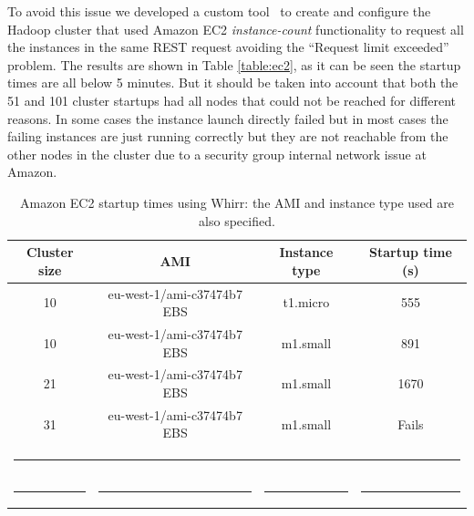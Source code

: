 To avoid this issue we developed a custom tool~\cite{hadoopondemand} to create and configure the Hadoop cluster that used Amazon EC2 \emph{instance-count} functionality to request all the instances in the same REST request avoiding the ``Request limit exceeded'' problem. The results are shown in Table \ref{table:ec2}, as it can be seen the startup times are all below 5 minutes. But it should be taken into account that both the 51 and 101 cluster startups had all nodes that could not be reached for different reasons. In some cases the instance launch directly failed but in most cases the failing instances are just running correctly but they are not reachable from the other nodes in the cluster due to a security group internal network issue at Amazon.


\begin{table}[h!]
\caption{Amazon EC2 startup times using Whirr: the AMI and instance type used are also specified.}
\label{table:whirr}
%
\vspace{-0.5em}
%
\begin{center}
\begin{tabular}{cccc}
\toprule
Cluster size				& AMI				& Instance type		& Startup time (s) 	  \\
\midrule
10                   			& eu-west-1/ami-c37474b7 EBS	& t1.micro 		& 555   		  \\
10                   			& eu-west-1/ami-c37474b7 EBS	& m1.small		& 891			  \\
21                   			& eu-west-1/ami-c37474b7 EBS	& m1.small 		& 1670			  \\
31                   			& eu-west-1/ami-c37474b7 EBS	& m1.small 		& Fails  		  \\
%
\bottomrule
\multicolumn{4}{c}{\rule{0.98\textwidth}{0em}}\\
\rule{0.2\textwidth}{0cm} & \rule{0.4\textwidth}{0cm} & \rule{0.2\textwidth}{0cm} &  \rule{0.2\textwidth}{0cm} \\
\end{tabular}
\end{center}
\end{table}

